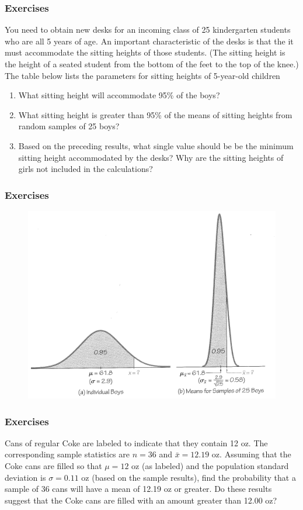 \documentclass[xcolor=dvipsnames]{beamer}
\begin{document}
\begin{frame}
  \frametitle{Exercises} 
  {\ubung} You need to obtain new desks for an incoming class of 25
  kindergarten students who are all 5 years of age. An important
  characteristic of the desks is that the it must accommodate the
  sitting heights of those students. (The sitting height is the height
  of a seated student from the bottom of the feet to the top of the
  knee.) The table below lists the parameters for sitting heights of
  5-year-old children
  \begin{enumerate}
  \item What sitting height will accommodate 95\% of the boys?
  \item What sitting height is greater than 95\% of the means of
    sitting heights from random samples of 25 boys?
  \item Based on the preceding results, what single value should
    be be the minimum sitting height accommodated by the desks? Why
    are the sitting heights of girls not included in the calculations?
  \end{enumerate}
\end{frame}

\begin{frame}
  \frametitle{Exercises} 
\begin{figure}[h]
\includegraphics[scale=.75]{./diagrams/triola-284.png}
\end{figure}
\end{frame}

\begin{frame}
  \frametitle{Exercises} 
  {\ubung} Cans of regular Coke are labeled to
  indicate that they contain 12 oz. The corresponding
  sample statistics are $n=36$ and $\bar{x}=12.19$ oz. Assuming that the
  Coke cans are filled so that $\mu=12$ oz (as labeled) and the
  population standard deviation is $\sigma=0.11$ oz (based on the sample
  results), find the probability that a sample of 36 cans will have a
  mean of 12.19 oz or greater. Do these results suggest that the Coke
  cans are filled with an amount greater than 12.00 oz?
\end{frame}
\end{document}
